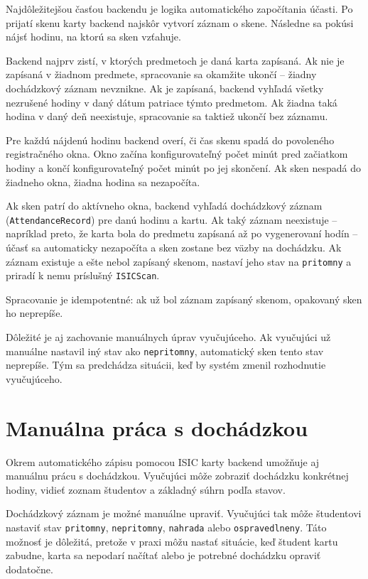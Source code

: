 Najdôležitejšou časťou backendu je logika automatického započítania účasti. Po prijatí skenu karty backend najskôr vytvorí záznam o skene. Následne sa pokúsi nájsť hodinu, na ktorú sa sken vzťahuje.

Backend najprv zistí, v ktorých predmetoch je daná karta zapísaná. Ak nie je zapísaná v žiadnom predmete, spracovanie sa okamžite ukončí -- žiadny dochádzkový záznam nevznikne. Ak je zapísaná, backend vyhľadá všetky nezrušené hodiny v daný dátum patriace týmto predmetom. Ak žiadna taká hodina v daný deň neexistuje, spracovanie sa taktiež ukončí bez záznamu.

Pre každú nájdenú hodinu backend overí, či čas skenu spadá do povoleného registračného okna. Okno začína konfigurovateľný počet minút pred začiatkom hodiny a končí konfigurovateľný počet minút po jej skončení. Ak sken nespadá do žiadneho okna, žiadna hodina sa nezapočíta.

Ak sken patrí do aktívneho okna, backend vyhľadá dochádzkový záznam (\texttt{AttendanceRecord}) pre danú hodinu a kartu. Ak taký záznam neexistuje -- napríklad preto, že karta bola do predmetu zapísaná až po vygenerovaní hodín -- účasť sa automaticky nezapočíta a sken zostane bez väzby na dochádzku. Ak záznam existuje a ešte nebol zapísaný skenom, nastaví jeho stav na \texttt{pritomny} a priradí k nemu príslušný \texttt{ISICScan}.

Spracovanie je idempotentné: ak už bol záznam zapísaný skenom, opakovaný sken ho neprepíše.

Dôležité je aj zachovanie manuálnych úprav vyučujúceho. Ak vyučujúci už manuálne nastavil iný stav ako \texttt{nepritomny}, automatický sken tento stav neprepíše. Tým sa predchádza situácii, keď by systém zmenil rozhodnutie vyučujúceho.

\section{Manuálna práca s dochádzkou}
\label{sec:backend-manual-attendance}

Okrem automatického zápisu pomocou ISIC karty backend umožňuje aj manuálnu prácu s dochádzkou. Vyučujúci môže zobraziť dochádzku konkrétnej hodiny, vidieť zoznam študentov a základný súhrn podľa stavov.

Dochádzkový záznam je možné manuálne upraviť. Vyučujúci tak môže študentovi nastaviť stav \texttt{pritomny}, \texttt{nepritomny}, \texttt{nahrada} alebo \texttt{ospravedlneny}. Táto možnosť je dôležitá, pretože v praxi môžu nastať situácie, keď študent kartu zabudne, karta sa nepodarí načítať alebo je potrebné dochádzku opraviť dodatočne.

